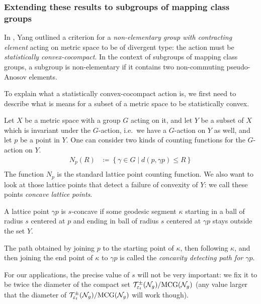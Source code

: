 \subsubsection{Extending these results to subgroups of mapping class groups}
\label{sec:extend-these-results}

In \cite{10.1093/imrn/rny001}, Yang outlined a criterion for a \emph{non-elementary group with contracting element} acting on metric space to be of divergent type: the action must be \emph{statistically convex-cocompact}.
In the context of subgroups of mapping class groups, a subgroup is non-elementary if it contains two non-commuting pseudo-Anosov elements.

To explain what a statistically convex-cocompact action is, we first need to describe what is means for a subset of a metric space to be statistically convex.

Let $X$ be a metric space with a group $G$ acting on it, and let $Y$ be a subset of $X$ which is invariant under the $G$-action, i.e.\ we have a $G$-action on $Y$ as well, and let $p$ be a point in $Y$.
One can consider two kinds of counting functions for the $G$-action on $Y$.
\begin{align*}
  N_p(R) &\coloneqq \left\{ \gamma \in G \mid d(p, \gamma p) \leq R \right\} \\
\end{align*}
The function $N_p$ is the standard lattice point counting function.
We also want to look at those lattice points that detect a failure of convexity of $Y$: we call these points \emph{concave lattice points}.
\begin{definition}
  A lattice point $\gamma p$ is $s$-concave if some geodesic segment $\kappa$ starting in a ball of radius $s$ centered at $p$ and ending in ball of radius $s$ centered at $\gamma p$ stays outside the set $Y$.

  The path obtained by joining $p$ to the starting point of $\kappa$, then following $\kappa$, and then joining the end point of $\kappa$ to $\gamma p$ is called the \emph{concavity detecting path for $\gamma p$}.
\end{definition}
For our applications, the precise value of $s$ will not be very important: we fix it to be twice the diameter of the compact set $\mathcal{T}_{\varepsilon_t}^{\pm}(\mathcal{N}_g)/\mathrm{MCG}(\mathcal{N}_g)$ (any value larger that the diameter of $\mathcal{T}_{\varepsilon_t}^{\pm}(\mathcal{N}_g)/\mathrm{MCG}(\mathcal{N}_g)$ will work though).

